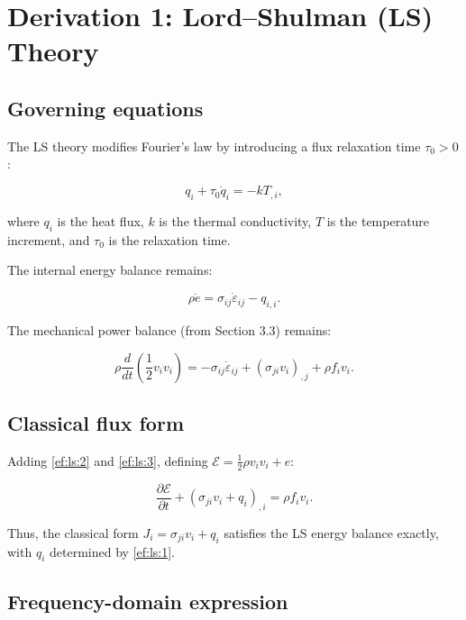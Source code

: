 \section{Derivation 1: Lord--Shulman (LS) Theory}

\subsection{Governing equations}

The LS theory modifies Fourier's law by introducing a flux relaxation time $\tau_0 > 0$:

\begin{equation}
q_i + \tau_0 \dot{q}_i = -k T_{,i},
\label{ef:ls:1}
\end{equation}

where $q_i$ is the heat flux, $k$ is the thermal conductivity, $T$ is the temperature increment, and $\tau_0$ is the relaxation time.

The internal energy balance remains:

\begin{equation}
\rho \dot{e} = \sigma_{ij}\dot{\varepsilon}_{ij} - q_{i,i}.
\label{ef:ls:2}
\end{equation}

The mechanical power balance (from Section 3.3) remains:

\begin{equation}
\rho \frac{d}{dt}\left(\frac{1}{2}v_i v_i\right)
= -\sigma_{ij}\dot{\varepsilon}_{ij} + (\sigma_{ji}v_i)_{,j} + \rho f_i v_i.
\label{ef:ls:3}
\end{equation}

\subsection{Classical flux form}

Adding \eqref{ef:ls:2} and \eqref{ef:ls:3}, defining $\mathcal{E} = \frac{1}{2}\rho v_i v_i + e$:

\begin{equation}
\frac{\partial\mathcal{E}}{\partial t} + (\sigma_{ji}v_i + q_i)_{,i} = \rho f_i v_i.
\label{ef:ls:4}
\end{equation}

Thus, the classical form $J_i = \sigma_{ji}v_i + q_i$ satisfies the LS energy balance exactly, with $q_i$ determined by \eqref{ef:ls:1}.

\subsection{Frequency-domain expression}

